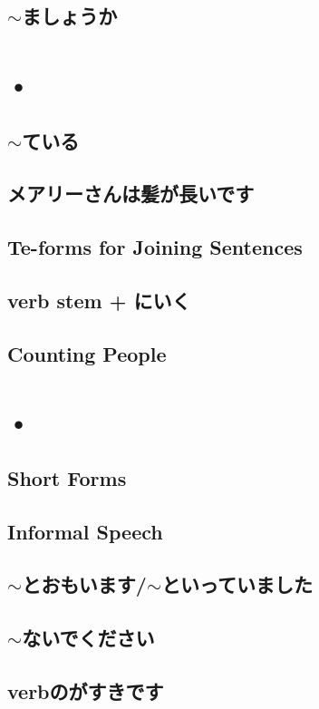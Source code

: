 \documentclass{article}
\begin{document}
   \subsection{$\sim$ましょうか}
   
   \newpage
   
   \section{•}
   \subsection{$\sim$ている}
   \subsection{メアリーさんは髪が長いです}
   \subsection{Te-forms for Joining Sentences}
   \subsection{verb stem + にいく}
   \subsection{Counting People}
   
   \newpage
   
   \section{•}
   \subsection{Short Forms}
   \subsection{Informal Speech}
   \subsection{$\sim$とおもいます/$\sim$といっていました}
   \subsection{$\sim$ないでください}
   \subsection{verbのがすきです}
\end{document}
